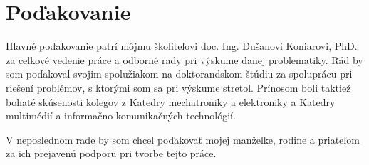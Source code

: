 \chapter*{Poďakovanie}

Hlavné poďakovanie patrí môjmu školiteľovi doc. Ing. Dušanovi Koniarovi, PhD. za celkové vedenie práce a odborné rady pri výskume danej problematiky. Rád by som poďakoval svojim spolužiakom na doktorandskom štúdiu za spoluprácu pri riešení problémov, s ktorými som sa pri výskume stretol. Prínosom boli taktiež bohaté skúsenosti kolegov z Katedry mechatroniky a elektroniky a Katedry multimédií a informačno-komunikačných technológií.

V neposlednom rade by som chcel poďakovať mojej manželke, rodine a priateľom za ich prejavenú podporu pri tvorbe tejto práce.

%
%
